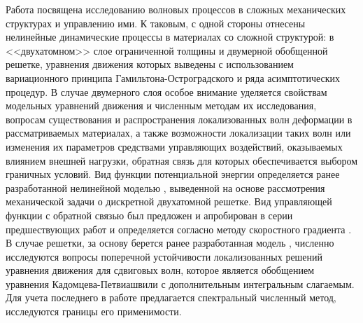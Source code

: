 

Работа посвящена исследованию волновых процессов в сложных механических структурах и управлению ими. К таковым, с одной стороны отнесены нелинейные динамические процессы в материалах со сложной структурой: в <<двухатомном>> слое ограниченной толщины и двумерной обобщенной решетке, уравнения движения которых выведены с использованием вариационного принципа Гамильтона-Остроградского и ряда асимптотических процедур. В случае двумерного слоя особое внимание уделяется свойствам модельных уравнений движения и численным методам их исследования, вопросам существования и распространения локализованных волн деформации в рассматриваемых материалах, а также возможности локализации таких волн или изменения их параметров средствами управляющих воздействий, оказываемых влиянием внешней нагрузки, обратная связь для которых обеспечивается выбором граничных условий. Вид функции потенциальной энергии определяется ранее разработанной нелинейной моделью \cite{bound_porsp17}, выведенной на основе рассмотрения механической задачи о дискретной двухатомной решетке. Вид управляющей функции с обратной связью был предложен и апробирован в серии предшествующих работ \cite{porant16,porant17,PorubovAntonov2018mechSystem} и определяется согласно методу скоростного градиента \cite{fradkov_rus_speed_grad}. В случае решетки, за основу берется ранее разработанная модель \cite{porkros}, численно исследуются вопросы поперечной устойчивости локализованных решений уравнения движения для сдвиговых волн, которое является обобщением уравнения Кадомцева-Петвиашвили \cite{kadpet} с дополнительным интегральным слагаемым. Для учета последнего в работе предлагается спектральный численный метод, исследуются границы его применимости.

